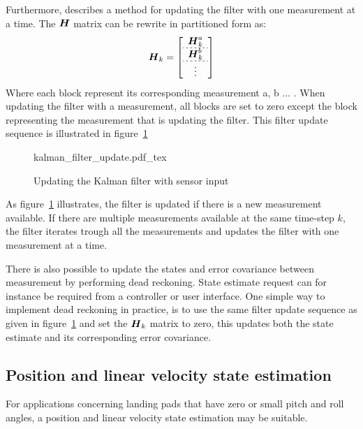 Furthermore, \cite{brown1997introduction} describes a method for updating the filter with one measurement at a time. The $\boldsymbol{H}$ matrix can be rewrite in partitioned form as:
\begin{equation}
    \vect{H}_{k}=
    \left[
    \begin{array}{c}
        \vect{H}_{k}^a\\ \hdashline[2pt/2pt]
        \vect{H}_{k}^b\\ \hdashline[2pt/2pt]
        \vdots \\
    \end{array}
    \right]
\end{equation}
Where each block represent its corresponding measurement a, b ... . When updating the filter with a measurement, all blocks are set to zero except the block representing the measurement that is updating the filter. This filter update sequence is illustrated in figure~\ref{fig:sensUpdate}

\begin{figure}[ht]
    \centering
    {kalman_filter_update.pdf_tex}
    \caption{Updating the Kalman filter with sensor input}
    \label{fig:sensUpdate}
\end{figure}
As figure~\ref{fig:sensUpdate} illustrates, the filter is updated if there is a new measurement available. If there are multiple measurements available at the same time-step $k$, the filter iterates trough all the measurements and updates the filter with one measurement at a time. 

There is also possible to update the states and error covariance between measurement by performing dead reckoning. State estimate request can for instance be required from a controller or user interface. One simple way to implement dead reckoning in practice, is to use the same filter update sequence as given in figure~\ref{fig:sensUpdate} and set the $\boldsymbol{H}_k$ matrix to zero, this updates both the state estimate and its corresponding error covariance. 


\subsection{Position and linear velocity state estimation}\label{ssub:pos_and_vel_state}
For applications concerning landing pads that have zero or small pitch and roll angles, a position and linear velocity state estimation may be suitable.

